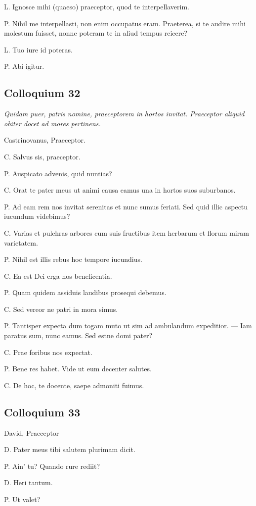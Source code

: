 \documentclass{article}
\begin{document}
L. Ignosce mihi (quaeso) praeceptor, quod te interpellaverim.

P. Nihil me interpellasti, non enim occupatus eram. Praeterea, si te audire mihi molestum fuisset, nonne poteram te in aliud tempus reicere?

L. Tuo iure id poteras.

P. Abi igitur.

\subsection{Colloquium 32}
\emph{Quidam puer, patris nomine, praeceptorem in hortos invitat. Praeceptor aliquid obiter docet ad mores pertinens.}

Castrinovanus, Praeceptor.

C. Salvus sis, praeceptor.

P. Auspicato advenis, quid nuntias?

C. Orat te pater meus ut animi causa eamus una in hortos suos suburbanos.

P. Ad eam rem nos invitat serenitas et nunc sumus feriati. Sed quid illic aspectu iucundum videbimus?

C. Varias et pulchras arbores cum suis fructibus item herbarum et florum miram varietatem.

P. Nihil est illis rebus hoc tempore iucundius.

C. Ea est Dei erga nos beneficentia.

P. Quam quidem assiduis laudibus prosequi debemus.

C. Sed vereor ne patri in mora simus.

P. Tantisper expecta dum togam muto ut sim ad ambulandum expeditior. --- Iam paratus sum, nunc eamus. Sed estne domi pater?

C. Prae foribus nos expectat.

P. Bene res habet. Vide ut eum decenter salutes.

C. De hoc, te docente, saepe admoniti fuimus.

\subsection{Colloquium 33}
David, Praeceptor

D. Pater meus tibi salutem plurimam dicit.

P. Ain' tu? Quando rure rediit?

D. Heri tantum.

P. Ut valet?
\end{document}
